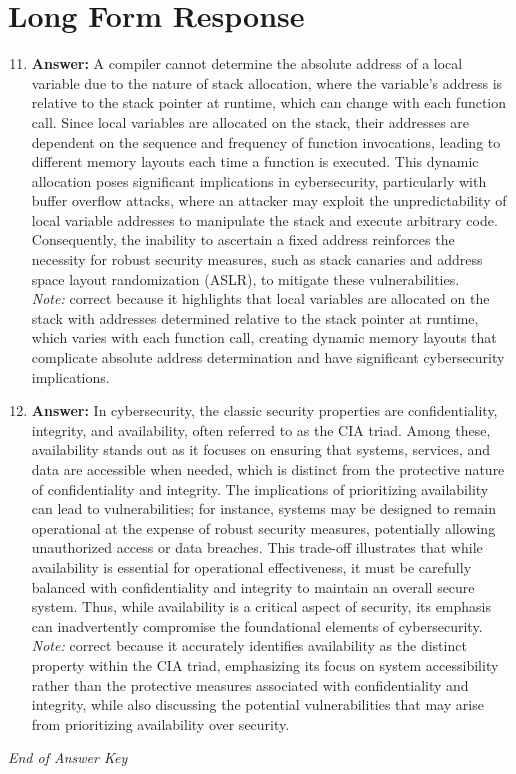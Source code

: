 \documentclass[12pt]{article}
\begin{document}
\section*{Long Form Response}
\begin{enumerate}[label=\arabic*.]
\setcounter{enumi}{10}
\item \textbf{Answer:} A compiler cannot determine the absolute address of a local variable due to the nature of stack allocation, where the variable's address is relative to the stack pointer at runtime, which can change with each function call. Since local variables are allocated on the stack, their addresses are dependent on the sequence and frequency of function invocations, leading to different memory layouts each time a function is executed. This dynamic allocation poses significant implications in cybersecurity, particularly with buffer overflow attacks, where an attacker may exploit the unpredictability of local variable addresses to manipulate the stack and execute arbitrary code. Consequently, the inability to ascertain a fixed address reinforces the necessity for robust security measures, such as stack canaries and address space layout randomization (ASLR), to mitigate these vulnerabilities.
\\ \textit{Note:} correct because it highlights that local variables are allocated on the stack with addresses determined relative to the stack pointer at runtime, which varies with each function call, creating dynamic memory layouts that complicate absolute address determination and have significant cybersecurity implications.
\item \textbf{Answer:} In cybersecurity, the classic security properties are confidentiality, integrity, and availability, often referred to as the CIA triad. Among these, availability stands out as it focuses on ensuring that systems, services, and data are accessible when needed, which is distinct from the protective nature of confidentiality and integrity. The implications of prioritizing availability can lead to vulnerabilities; for instance, systems may be designed to remain operational at the expense of robust security measures, potentially allowing unauthorized access or data breaches. This trade-off illustrates that while availability is essential for operational effectiveness, it must be carefully balanced with confidentiality and integrity to maintain an overall secure system. Thus, while availability is a critical aspect of security, its emphasis can inadvertently compromise the foundational elements of cybersecurity.
\\ \textit{Note:} correct because it accurately identifies availability as the distinct property within the CIA triad, emphasizing its focus on system accessibility rather than the protective measures associated with confidentiality and integrity, while also discussing the potential vulnerabilities that may arise from prioritizing availability over security.
\end{enumerate}

\vfill
\noindent\textit{End of Answer Key}
\end{document}
